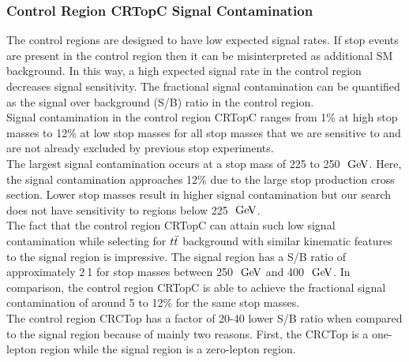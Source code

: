 \subsubsection{Control Region CRTopC Signal Contamination}

\indent The control regions are designed to have low expected signal rates.  If stop events are present in the control region then it can be misinterpreted as additional SM background.  In this way, a high expected signal rate in the control region decreases signal sensitivity.  The fractional signal contamination can be quantified as the signal over background (S/B) ratio in the control region. \\%

\indent Signal contamination in the control region CRTopC ranges from 1\% at high stop masses to 12\% at low stop masses for all stop masses that we are sensitive to and are not already excluded by previous stop experiments. \\%

\indent The largest signal contamination occurs at a stop mass of 225 to 250 $\gev$.   Here, the signal contamination approaches 12\% due to the large stop production cross section.  Lower stop masses result in higher signal contamination but our search does not have sensitivity to regions below 225 $\gev$.  \\

\indent The fact that the control region CRTopC can attain such low signal contamination while selecting for $t\bar{t}$ background with similar kinematic features to the signal region is impressive.  The signal region has a S/B ratio of approximately 2$\:$1 for stop masses between 250 $\gev$ and 400 $\gev$.   In comparison, the control region CRTopC is able to achieve the fractional signal contamination of around 5 to 12\% for the same stop masses.  \\

\indent The control region CRCTop has a factor of 20-40 lower S/B ratio when compared to the signal region because of mainly two reasons.  First, the CRCTop is a one-lepton region while the signal region is a zero-lepton region. \\

